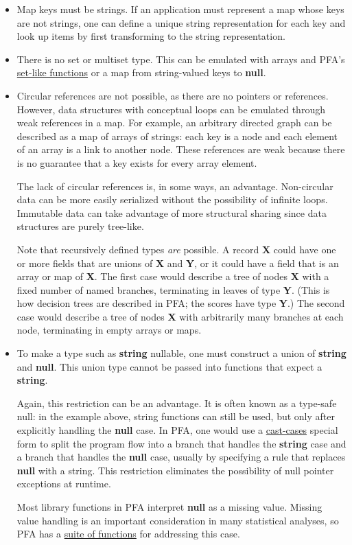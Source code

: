 \documentclass{article}
\newcommand{\PFAc}{\ttfamily\bfseries}
\newcommand{\PFAtp}{\ttfamily\bfseries}
\theoremstyle{definition}
\begin{document}
\vspace{-0.15 cm}
\begin{itemize}
\item Map keys must be strings.  If an application must represent a map whose keys are not strings, one can define a unique string representation for each key and look up items by first transforming to the string representation.

\item There is no set or multiset type.  This can be emulated with arrays and PFA's \hyperlink{hsec:set-like}{set-like functions} or a map from string-valued keys to {\PFAc null}.

\item Circular references are not possible, as there are no pointers or references.  However, data structures with conceptual loops can be emulated through weak references in a map.  For example, an arbitrary directed graph can be described as a map of arrays of strings: each key is a node and each element of an array is a link to another node.  These references are weak because there is no guarantee that a key exists for every array element.

The lack of circular references is, in some ways, an advantage.  Non-circular data can be more easily serialized without the possibility of infinite loops.  Immutable data can take advantage of more structural sharing since data structures are purely tree-like.

Note that recursively defined types {\it are} possible.  A record {\PFAtp X} could have one or more fields that are unions of {\PFAtp X} and {\PFAtp Y}, or it could have a field that is an array or map of {\PFAtp X}.  The first case would describe a tree of nodes {\PFAtp X} with a fixed number of named branches, terminating in leaves of type {\PFAtp Y}.  (This is how decision trees are described in PFA; the scores have type {\PFAtp Y}.)  The second case would describe a tree of nodes {\PFAtp X} with arbitrarily many branches at each node, terminating in empty arrays or maps.

\item To make a type such as {\bf string} nullable, one must construct a union of {\bf string} and {\bf null}.  This union type cannot be passed into functions that expect a {\bf string}.

Again, this restriction can be an advantage.  It is often known as a type-safe null: in the example above, string functions can still be used, but only after explicitly handling the {\bf null} case.  In PFA, one would use a \hyperlink{hsec:casting}{cast-cases} special form to split the program flow into a branch that handles the {\bf string} case and a branch that handles the {\bf null} case, usually by specifying a rule that replaces {\PFAc null} with a string.  This restriction eliminates the possibility of null pointer exceptions at runtime.

Most library functions in PFA interpret {\PFAc null} as a missing value.  Missing value handling is an important consideration in many statistical analyses, so PFA has a \hyperlink{hsec:impute}{suite of functions} for addressing this case.
\end{itemize}
\end{document}
